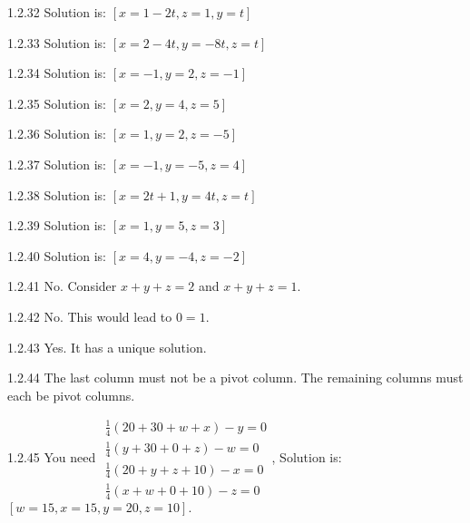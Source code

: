 \begin{Answer}{1.2.32}
Solution is: $\left[ x=1-2t,z=1,y=t\right] $
\end{Answer}
\begin{Answer}{1.2.33}
Solution is: $\left[ x=2-4t,y=-8t,z=t\right] $
\end{Answer}
\begin{Answer}{1.2.34}
 Solution is: $\left[x=-1,y=2,z=-1\right] $
\end{Answer}
\begin{Answer}{1.2.35}
Solution is:
$\left[ x=2,y=4,z=5\right] $
\end{Answer}
\begin{Answer}{1.2.36}
Solution is: $\left[ x=1,y=2,z=-5\right] $
\end{Answer}
\begin{Answer}{1.2.37}
 Solution is: $\left[x=-1,y=-5,z=4\right] $
\end{Answer}
\begin{Answer}{1.2.38}
Solution is: $\left[ x=2t+1,y=4t,z=t\right] $
\end{Answer}
\begin{Answer}{1.2.39}
Solution is: $\left[x=1,y=5,z=3\right] $
\end{Answer}
\begin{Answer}{1.2.40}
Solution is: $\left[ x=4,y=-4,z=-2\right] $
\end{Answer}
\begin{Answer}{1.2.41}
No. Consider $x+y+z=2$ and $x+y+z=1.$
\end{Answer}
\begin{Answer}{1.2.42}
 No. This would lead to $0=1.$
\end{Answer}
\begin{Answer}{1.2.43}
Yes. It has a unique solution.
\end{Answer}
\begin{Answer}{1.2.44}
The last column must not be a pivot column. The remaining columns must each be pivot
columns.
\end{Answer}
\begin{Answer}{1.2.45}
You need $
\begin{array}{c}
\frac{1}{4}\left( 20+30+w+x\right) -y=0 \\
\frac{1}{4}\left( y+30+0+z\right) -w=0 \\
\frac{1}{4}\left( 20+y+z+10\right) -x=0 \\
\frac{1}{4}\left( x+w+0+10\right) -z=0
\end{array}
$, Solution is: $\left[ w=15,x=15,y=20,z=10\right] .$
\end{Answer}

